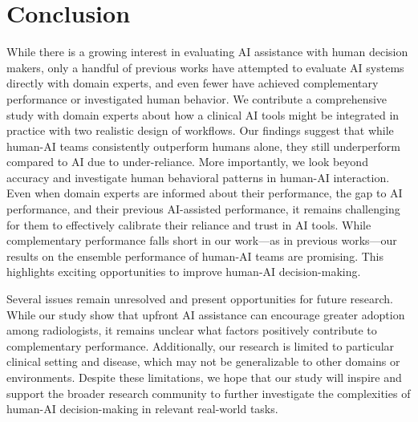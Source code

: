 \section{Conclusion}

While there is a growing interest in evaluating AI assistance with human decision makers, only a handful of previous works have attempted to evaluate AI systems directly with domain experts, and even fewer have achieved complementary performance or investigated human behavior. 
We contribute a comprehensive study with domain experts about how a clinical AI tools might be integrated in practice with two realistic design of workflows. Our findings suggest that while human-AI teams consistently outperform humans alone, they still underperform compared to AI due to under-reliance.
More importantly, we look beyond accuracy and investigate human behavioral patterns in human-AI interaction. 
Even when domain experts are informed about their performance, the gap to AI performance, and their previous AI-assisted performance, it remains challenging for them to effectively calibrate their reliance and trust in AI tools. 
While complementary performance falls short in our work---as in previous works---our results on the ensemble performance of human-AI teams are promising.
This highlights exciting opportunities to improve human-AI decision-making. 



Several issues remain unresolved and present opportunities for future research. 
While our study show that upfront AI assistance can encourage greater adoption among radiologists, it remains unclear what factors positively contribute to complementary performance.
Additionally, our research is limited to particular clinical setting and disease, which may not be generalizable to other domains or environments. 
Despite these limitations, we hope that our study will inspire and support the broader research community to further investigate the complexities of human-AI decision-making in relevant real-world tasks.
